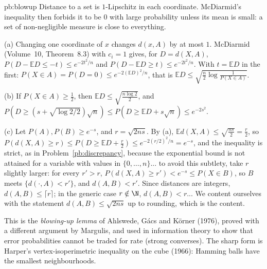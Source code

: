 \begin{solution}{pb:blowup}
\idea Distance to a set is $1$-Lipschitz in each coordinate. McDiarmid's inequality then forbids it to be $0$ with large probability unless its mean is small: a set of
non-negligible measure is close to everything.

\writeup (a) Changing one coordinate of $x$ changes $d(x,A)$ by at most $1$. McDiarmid (Volume~10, Theorem~8.3) with $c_i=1$ gives, for $D=d(X,A)$,
$P(D-\mathbb ED\le-t)\le e^{-2t^2/n}$ and $P(D-\mathbb ED\ge t)\le e^{-2t^2/n}$. With $t=\mathbb ED$ in the first: $P(X\in A)=P(D=0)\le e^{-2(\mathbb ED)^2/n}$, that is
$\mathbb ED\le\sqrt{\frac n2\log\frac1{P(X\in A)}}$.

(b) If $P(X\in A)\ge\frac12$, then $\mathbb ED\le\sqrt{\frac{n\log2}2}$, and $P(D\ge(s+\sqrt{\log2/2})\sqrt n)\le P(D\ge\mathbb ED+s\sqrt n)\le e^{-2s^2}$.

(c) Let $P(A),P(B)\ge e^{-s}$, and $r=\sqrt{2ns}$. By (a), $\mathbb Ed(X,A)\le\sqrt{\frac{ns}2}=\frac r2$, so $P(d(X,A)\ge r)\le P(D\ge\mathbb ED+\frac r2)\le e^{-2(r/2)^2/n}=e^{-s}$, and
the inequality is strict, as in Problem~\ref{pb:discrepancy}, because the exponential bound is not attained for a variable with values in $\{0,\dots,n\}$... to avoid this
subtlety, take $r$ slightly larger: for every $r'>r$, $P(d(X,A)\ge r')<e^{-s}\le P(X\in B)$, so $B$ meets $\{d(\cdot,A)<r'\}$, and $d(A,B)<r'$. Since distances are integers,
$d(A,B)\le\lceil r\rceil$; in the generic case $r\notin\N$, $d(A,B)<r$... We content ourselves with the statement $d(A,B)\le\sqrt{2ns}$ up to rounding, which is the content.

\leads This is the \emph{blowing-up lemma} of Ahlswede, G\'acs and K\"orner (1976), proved with a different argument by Margulis, and used in information theory to show that
error probabilities cannot be traded for rate (strong converses). The sharp form is Harper's vertex-isoperimetric inequality on the cube (1966): Hamming balls have the smallest
neighbourhoods.
\end{solution}

